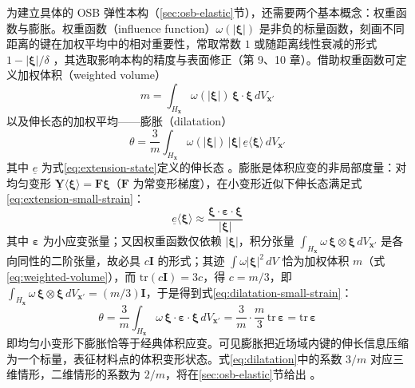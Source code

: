 为建立具体的 OSB 弹性本构（\ref{sec:osb-elastic}节），还需要两个基本概念：权重函数与膨胀。权重函数（influence function）$\omega(|\boldsymbol{\xi}|)$ 是非负的标量函数，刻画不同距离的键在加权平均中的相对重要性，常取常数 $1$ 或随距离线性衰减的形式 $1-|\boldsymbol{\xi}|/\delta$ \cite{Silling2007}，其选取影响本构的精度与表面修正（第 9、10 章）。借助权重函数可定义加权体积（weighted volume）
\begin{equation}
  m=\int_{H_{\mathbf{x}}}\omega(|\boldsymbol{\xi}|)\,\boldsymbol{\xi}\cdot\boldsymbol{\xi}\,dV_{\mathbf{x}'}
  \label{eq:weighted-volume}
\end{equation}
以及伸长态的加权平均——膨胀（dilatation）
\begin{equation}
  \theta=\frac{3}{m}\int_{H_{\mathbf{x}}}\omega(|\boldsymbol{\xi}|)\,|\boldsymbol{\xi}|\,\underline{e}\langle\boldsymbol{\xi}\rangle\,dV_{\mathbf{x}'}
  \label{eq:dilatation}
\end{equation}
其中 $\underline{e}$ 为式\eqref{eq:extension-state}定义的伸长态 \cite{Silling2007}。膨胀是体积应变的非局部度量：对均匀变形 $\underline{\mathbf{Y}}\langle\boldsymbol{\xi}\rangle=\mathbf{F}\boldsymbol{\xi}$（$\mathbf{F}$ 为常变形梯度），在小变形近似下伸长态满足式\eqref{eq:extension-small-strain}：
\begin{equation}
  \underline{e}\langle\boldsymbol{\xi}\rangle\approx\frac{\boldsymbol{\xi}\cdot\boldsymbol{\varepsilon}\cdot\boldsymbol{\xi}}{|\boldsymbol{\xi}|}
  \label{eq:extension-small-strain}
\end{equation}
其中 $\boldsymbol{\varepsilon}$ 为小应变张量；又因权重函数仅依赖 $|\boldsymbol{\xi}|$，积分张量 $\int_{H_{\mathbf{x}}}\omega\,\boldsymbol{\xi}\otimes\boldsymbol{\xi}\,dV_{\mathbf{x}'}$ 是各向同性的二阶张量，故必具 $c\mathbf{I}$ 的形式；其迹 $\int\omega|\boldsymbol{\xi}|^{2}\,dV$ 恰为加权体积 $m$（式\eqref{eq:weighted-volume}），而 $\mathrm{tr}(c\mathbf{I})=3c$，得 $c=m/3$，即 $\int_{H_{\mathbf{x}}}\omega\,\boldsymbol{\xi}\otimes\boldsymbol{\xi}\,dV_{\mathbf{x}'}=(m/3)\mathbf{I}$，于是得到式\eqref{eq:dilatation-small-strain}：
\begin{equation}
  \theta=\frac{3}{m}\int_{H_{\mathbf{x}}}\omega\,\boldsymbol{\xi}\cdot\boldsymbol{\varepsilon}\cdot\boldsymbol{\xi}\,dV_{\mathbf{x}'}
  =\frac{3}{m}\cdot\frac{m}{3}\,\mathrm{tr}\,\boldsymbol{\varepsilon}
  =\mathrm{tr}\,\boldsymbol{\varepsilon}
  \label{eq:dilatation-small-strain}
\end{equation}
即均匀小变形下膨胀恰等于经典体积应变。可见膨胀把近场域内键的伸长信息压缩为一个标量，表征材料点的体积变形状态。式\eqref{eq:dilatation}中的系数 $3/m$ 对应三维情形，二维情形的系数为 $2/m$，将在\ref{sec:osb-elastic}节给出 \cite{MadenciOterkus2014}。


